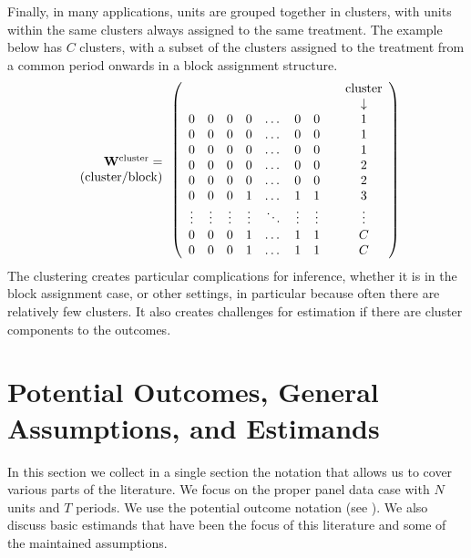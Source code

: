 \documentclass[letterpaper,12pt,leqno]{article}
\newcommand{\cluster}{{\rm cluster}}
\newcommand{\ttock}{1}
\newcommand{\ttick}{0}
\newcommand{\bw}{{\bf W}}
\begin{document}
Finally, in many applications, units are grouped together in clusters, with units within the same clusters always assigned to the same treatment. The example below has $C$ clusters, with a subset of the clusters assigned to the treatment from a common period onwards in a block assignment structure. 
\[ 
\begin{array}{r}\bw^\cluster=\\ 
({\rm cluster/block})
\end{array}\left(
\begin{array}{ccccccccccc}
& &   & & &   &  & &\textrm{cluster}\\
 & &   & & &   &  & &\downarrow\\
	\ttick & \ttick & \ttick  & \ttick & \dots & \ttick  & \ttick & & 1\\
	\ttick & \ttick & \ttick  & \ttick & \dots & \ttick  & \ttick & & 1\\
	\ttick  & \ttick & \ttick & \ttick   & \dots & \ttick  & \ttick& & 1 \\
	\ttick  & \ttick & \ttick  & \ttick  & \dots & \ttick  & \ttick& & 2 \\
	\ttick  & \ttick & \ttick  & \ttick  & \dots & \ttick  & \ttick & & 2\\
	\ttick  & \ttick & \ttick & {\ttock}   & \dots & {\ttock}  & {\ttock} & & 3\\
	\vdots   &  \vdots  &  \vdots& \vdots &\ddots &\vdots &\vdots & & \vdots\\
	\ttick  & \ttick & \ttick   & {\ttock} & \dots & {\ttock} & {\ttock} & & C  \\
 \ttick  & \ttick & \ttick   & {\ttock} & \dots & {\ttock} & {\ttock}  & & C \\
\end{array}
\right)\]
The clustering creates particular complications for inference, whether it is in the block assignment case, or other settings, in particular because often there are relatively few clusters. It also creates challenges for  estimation if there are cluster components to the outcomes.


\section{Potential Outcomes, General Assumptions, and Estimands}\label{notation}


In this section we collect in a single section the notation that allows us to cover various parts of the literature. We focus on the proper panel data case with $N$ units and $T$ periods. We use the potential outcome notation (see \citealp{rubin1974estimating, imbens2015causal}). We also discuss basic estimands that have been the focus of this literature and some of the maintained assumptions. 
\end{document}
